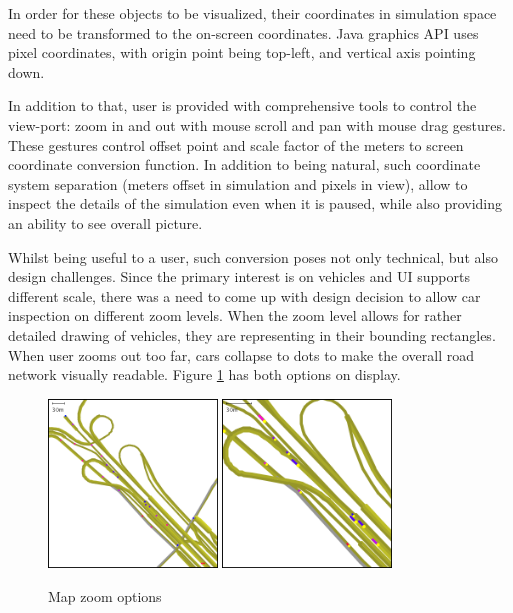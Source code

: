 In order for these objects to be visualized, their coordinates in simulation space need to be transformed to the on-screen coordinates. Java graphics API uses pixel coordinates, with origin point being top-left, and vertical axis pointing down.

In addition to that, user is provided with comprehensive tools to control the view-port: zoom in and out with mouse scroll and pan with mouse drag gestures. These gestures control offset point and scale factor of the meters to screen coordinate conversion function. In addition to being natural, such coordinate system separation (meters offset in simulation and pixels in view), allow to inspect the details of the simulation even when it is paused, while also providing an ability to see overall picture.

Whilst being useful to a user, such conversion poses not only technical, but also design challenges. Since the primary interest is on vehicles and UI supports different scale, there was a need to come up with design decision to allow car inspection on different zoom levels. When the zoom level allows for rather detailed drawing of vehicles, they are representing in their bounding rectangles. When user zooms out too far, cars collapse to dots to make the overall road network visually readable. Figure \ref{fig:mapZoomOptions} has both options on display.
\begin{figure}[!h]
    \vspace{1.5em}
    \caption{Map zoom options}
    \label{fig:mapZoomOptions}
    \centering
    \includegraphics[width=0.4\textwidth]{figs/road/zoom_dots.png}
    \hspace{0.2em}
    \includegraphics[width=0.4\textwidth]{figs/road/zoom_cars.png}
    \vspace{1.5em}
\end{figure}


